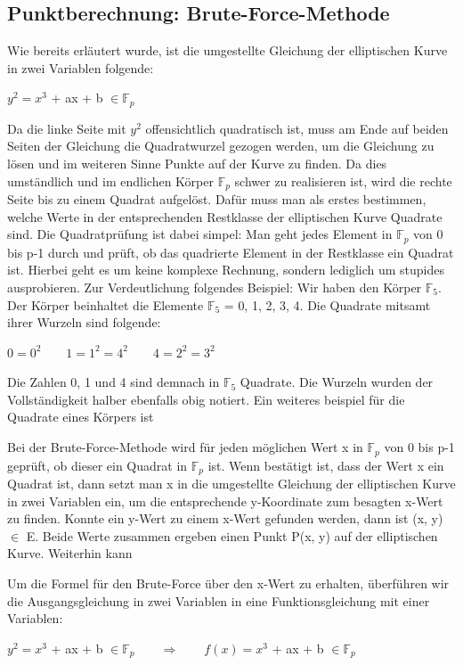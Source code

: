 \subsection{Punktberechnung: Brute-Force-Methode}
Wie bereits erläutert wurde, ist die umgestellte Gleichung der elliptischen Kurve in zwei Variablen folgende:
\begin{center}
$y^{2} =  x^{3}$ + ax + b  $\in \mathbb{F}_{p}$
\end{center}

Da die linke Seite mit $y^{2}$ offensichtlich quadratisch ist, muss am Ende auf beiden Seiten der Gleichung die Quadratwurzel gezogen werden, um die Gleichung zu lösen und im weiteren Sinne Punkte auf der Kurve zu finden. Da dies umständlich und im endlichen Körper $\mathbb{F}_{p}$ schwer zu realisieren ist, wird die rechte Seite bis zu einem Quadrat aufgelöst. Dafür muss man als erstes bestimmen, welche Werte in der entsprechenden Restklasse der elliptischen Kurve Quadrate sind. Die Quadratprüfung ist dabei simpel: Man geht jedes Element in $\mathbb{F}_{p}$ von 0 bis p-1 durch und prüft, ob das quadrierte Element in der Restklasse ein Quadrat ist. Hierbei geht es um keine komplexe Rechnung, sondern lediglich um stupides ausprobieren. Zur Verdeutlichung folgendes Beispiel: Wir haben den Körper $\mathbb{F}_{5}$. Der Körper beinhaltet die Elemente $\mathbb{F}_{5}$ = {0, 1, 2, 3, 4}. Die Quadrate mitsamt ihrer Wurzeln sind folgende:
\begin{center}
$0 = 0^{2} \qquad 1 = 1^{2} = 4^{2} \qquad 4 = 2^{2} = 3^{2}$
\end{center}

Die Zahlen 0, 1 und 4 sind demnach in $\mathbb{F}_{5}$ Quadrate. Die Wurzeln wurden der Vollständigkeit halber ebenfalls obig notiert. Ein weiteres beispiel für die Quadrate eines Körpers ist


Bei der Brute-Force-Methode wird für jeden möglichen Wert x in $\mathbb{F}_p$ von 0 bis p-1 geprüft, ob dieser ein Quadrat in $\mathbb{F}_p$ ist. Wenn bestätigt ist, dass der Wert x ein Quadrat ist, dann setzt man x in die umgestellte Gleichung der elliptischen Kurve in zwei Variablen ein, um die entsprechende y-Koordinate zum besagten x-Wert zu finden. Konnte ein y-Wert zu einem x-Wert gefunden werden, dann ist (x, y) $\in$ E. Beide Werte zusammen ergeben einen Punkt P(x, y) auf der elliptischen Kurve. Weiterhin kann 

Um die Formel für den Brute-Force über den x-Wert zu erhalten, überführen wir die Ausgangsgleichung in zwei Variablen in eine Funktionsgleichung mit einer Variablen:
\begin{center}
$y^{2} =  x^{3}$ + ax + b  $\in \mathbb{F}_{p} \qquad \Longrightarrow \qquad f(x) =  x^{3}$ + ax + b  $\in \mathbb{F}_{p}$
\end{center}


